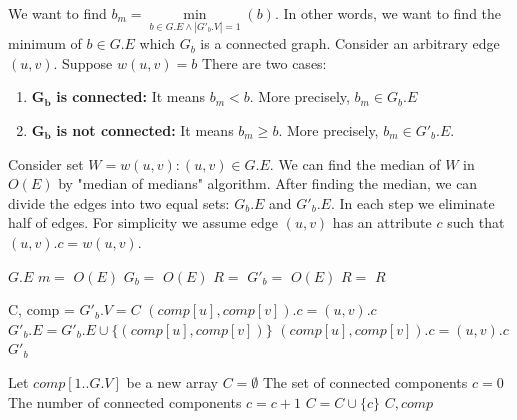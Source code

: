 \documentclass{book}
\begin{document}
	We want to find $b_{m} = \min\limits_{b \in G.E \land |G'_b.V| = 1}(b)$. In other words, we want to find the minimum of $b \in G.E$ which $G_b$ is a connected graph. Consider an arbitrary edge $(u, v)$. Suppose $w(u, v) = b$ There are two cases:
	\begin{enumerate}
		\item $\boldsymbol{G_b}$\textbf{ is connected:} It means $b_m < b$. More precisely, $b_m \in G_b.E$
		\item $\boldsymbol{G_b}$\textbf{ is not connected:} It means $b_m \ge b$. More precisely, $b_m \in G'_b.E$. 
	\end{enumerate}
	Consider set $W = {w(u, v) : (u, v) \in G.E}$. We can find the median of $W$ in $O(E)$ by "median of medians" algorithm. After finding the median, we can divide the edges into two equal sets: $G_b.E$ and $G'_b.E$. In each step we eliminate half of edges. For simplicity we assume edge $(u, v)$ has an attribute $c$ such that $(u, v).c = w(u, v)$.
	\begin{algorithm*}[h!]
		\begin{algorithmic}[1]
					\State \Return $G.E$
				\EndIf
				\State $m = $  \Comment $O(E)$
					\State $G_b = $  \Comment $O(E)$
					\State $R = $ 
				\Else
					\State $G'_b = $  \Comment $O(E)$
					\State $R = $ 
				\EndIf
				\State \Return $R$
			\EndFunction
		\end{algorithmic}
	\end{algorithm*}
	
	\begin{algorithm*}[h!]
		\begin{algorithmic}[1]
				\State C, comp = 
				\State $G'_b.V = C$
							\State $(comp[u], comp[v]).c = (u, v).c$
							\State $G'_b.E = G'_b.E \cup \{(comp[u], comp[v])\}$
							\State $(comp[u], comp[v]).c = (u, v).c$
						\EndIf
					\EndIf
				\EndFor
				\State \Return $G'_b$
			\EndFunction
		\end{algorithmic}
	\end{algorithm*}
	
	\begin{algorithm*}[h!]
		\begin{algorithmic}[1]
				\State Let $comp[1..G.V]$ be a new array
				\State $C = \emptyset$ \Comment The set of connected components
				\State $c = 0$ \Comment The number of connected components
				\State {}
						\State $c = c + 1$
						\State $C = C \cup \{c\}$
						\State {}
					\EndIf
				\EndFor
				\State \Return $C, comp$
			\EndFunction
		\end{algorithmic}
	\end{algorithm*}
	
\end{document}
